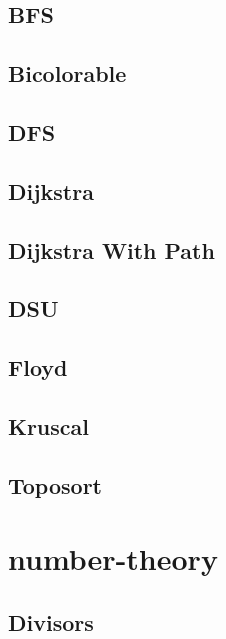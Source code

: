 \subsection{BFS}
\raggedbottom
\hrulefill
\subsection{Bicolorable}
\raggedbottom
\hrulefill
\subsection{DFS}
\raggedbottom
\hrulefill
\subsection{Dijkstra}
\raggedbottom
\hrulefill
\subsection{Dijkstra With Path}
\raggedbottom
\hrulefill
\subsection{DSU}
\raggedbottom
\hrulefill
\subsection{Floyd}
\raggedbottom
\hrulefill
\subsection{Kruscal}
\raggedbottom
\hrulefill
\subsection{Toposort}
\raggedbottom
\hrulefill

\section{number-theory}
\subsection{Divisors}
\raggedbottom
\hrulefill
